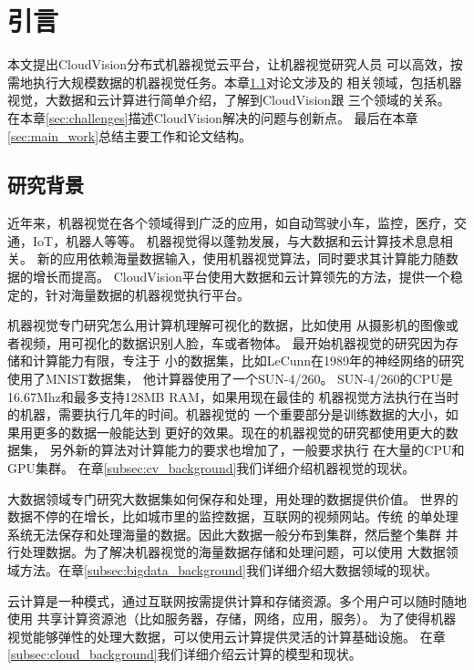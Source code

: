 \chapter{引言}
\label{cha:intro}
本文提出CloudVision分布式机器视觉云平台，让机器视觉研究人员
可以高效，按需地执行大规模数据的机器视觉任务。本章\ref{sec:background}对论文涉及的
相关领域，包括机器视觉，大数据和云计算进行简单介绍，了解到CloudVision跟
三个领域的关系。
在本章\ref{sec:challenges}描述CloudVision解决的问题与创新点。
最后在本章\ref{sec:main_work}总结主要工作和论文结构。

\section{研究背景}
\label{sec:background}
近年来，机器视觉在各个领域得到广泛的应用，如自动驾驶小车，监控，医疗，交通，IoT，机器人等等。
机器视觉得以蓬勃发展，与大数据和云计算技术息息相关。
新的应用依赖海量数据输入，使用机器视觉算法，同时要求其计算能力随数据的增长而提高。
CloudVision平台使用大数据和云计算领先的方法，提供一个稳定的，针对海量数据的机器视觉执行平台。

机器视觉专门研究怎么用计算机理解可视化的数据，比如使用
从摄影机的图像或者视频，用可视化的数据识别人脸，车或者物体。
最开始机器视觉的研究因为存储和计算能力有限，专注于
小的数据集，比如LeCunn在1989年的神经网络的研究使用了MNIST数据集，
他计算器使用了一个SUN-4/260。\cite{lecun1989backpropagation}
SUN-4/260的CPU是16.67Mhz和最多支持128MB RAM，如果用现在最佳的
机器视觉方法执行在当时的机器，需要执行几年的时间。机器视觉的
一个重要部分是训练数据的大小，如果用更多的数据一般能达到
更好的效果。现在的机器视觉的研究都使用更大的数据集，
另外新的算法对计算能力的要求也增加了，一般要求执行
在大量的CPU和GPU集群。\cite{googlenet2015,baidup2015deepgpu}
在章\ref{subsec:cv_background}我们详细介绍机器视觉的现状。

大数据领域专门研究大数据集如何保存和处理，用处理的数据提供价值。
世界的数据不停的在增长，比如城市里的监控数据，互联网的视频网站。传统
的单处理系统无法保存和处理海量的数据。因此大数据一般分布到集群，然后整个集群
并行处理数据。为了解决机器视觉的海量数据存储和处理问题，可以使用
大数据领域方法。在章\ref{subsec:bigdata_background}我们详细介绍大数据领域的现状。

云计算是一种模式，通过互联网按需提供计算和存储资源。多个用户可以随时随地使用
共享计算资源池（比如服务器，存储，网络，应用，服务）。
为了使得机器视觉能够弹性的处理大数据，可以使用云计算提供灵活的计算基础设施。
在章\ref{subsec:cloud_background}我们详细介绍云计算的模型和现状。




